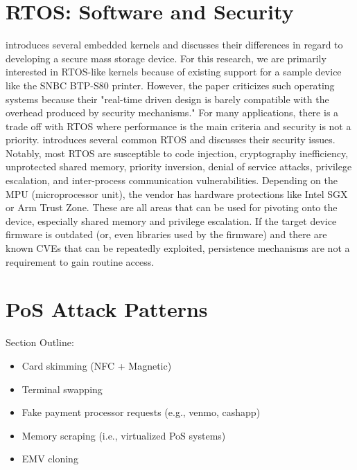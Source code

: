 \section{RTOS: Software and Security}  \label{rtossoftwaresecurity}


\autocite{Benadjila2018WooKeyU} introduces several embedded kernels and discusses their differences in regard to developing a secure mass storage device. For this research, we are primarily interested in RTOS-like kernels because of existing support for a sample device like the SNBC BTP-S80 printer. However, the paper criticizes such operating systems because their "real-time driven design is barely compatible with the overhead produced by security mechanisms." For many applications, there is a trade off with RTOS where performance is the main criteria and security is not a priority. \autocite{yuRealTimeOperatingSystem} introduces several common RTOS and discusses their security issues. Notably, most RTOS are susceptible to code injection, cryptography inefficiency, unprotected shared memory, priority inversion, denial of service attacks, privilege escalation, and inter-process communication vulnerabilities. Depending on the MPU (microprocessor unit), the vendor has hardware protections like Intel SGX or Arm Trust Zone. These are all areas that can be used for pivoting onto the device, especially shared memory and privilege escalation. If the target device firmware is outdated (or, even libraries used by the firmware) and there are known CVEs that can be repeatedly exploited, persistence mechanisms are not a requirement to gain routine access.

\section{PoS Attack Patterns} \label{posattackpatterns}

Section Outline:
\begin{itemize}
  \item Card skimming (NFC + Magnetic)
  \item Terminal swapping
  \item Fake payment processor requests (e.g., venmo, cashapp)
  \item Memory scraping (i.e., virtualized PoS systems)
  \item EMV cloning
\end{itemize}


